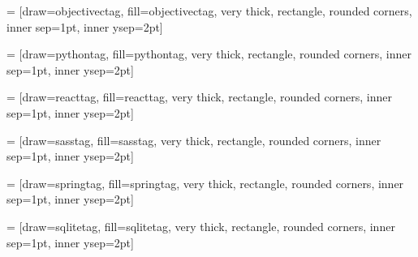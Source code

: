  = [draw=objectivectag, fill=objectivectag, very thick, rectangle, rounded corners, inner sep=1pt, inner ysep=2pt]
\newcommand{\objectivectag}{\begin{tikzpicture}\node [objectivectag] (box){{\scriptsize \textbf{\phantom{|}Objective-C\phantom{|}}}};\end{tikzpicture}}
\usepackage{tikz}
    
 = [draw=pythontag, fill=pythontag, very thick, rectangle, rounded corners, inner sep=1pt, inner ysep=2pt]
\newcommand{\pythontag}{\begin{tikzpicture}\node [pythontag] (box){{\scriptsize \textbf{\phantom{|}Python\phantom{|}}}};\end{tikzpicture}}
\usepackage{tikz}
    
 = [draw=reacttag, fill=reacttag, very thick, rectangle, rounded corners, inner sep=1pt, inner ysep=2pt]
\newcommand{\reacttag}{\begin{tikzpicture}\node [reacttag] (box){{\scriptsize \textbf{\phantom{|}React\phantom{|}}}};\end{tikzpicture}}
\usepackage{tikz}
    
 = [draw=sasstag, fill=sasstag, very thick, rectangle, rounded corners, inner sep=1pt, inner ysep=2pt]
\newcommand{\sasstag}{\begin{tikzpicture}\node [sasstag] (box){{\scriptsize \textbf{\phantom{|}SASS\phantom{|}}}};\end{tikzpicture}}
\usepackage{tikz}
    
 = [draw=springtag, fill=springtag, very thick, rectangle, rounded corners, inner sep=1pt, inner ysep=2pt]
\newcommand{\springtag}{\begin{tikzpicture}\node [springtag] (box){{\scriptsize \textbf{\phantom{|}Spring\phantom{|}}}};\end{tikzpicture}}
\usepackage{tikz}
    
 = [draw=sqlitetag, fill=sqlitetag, very thick, rectangle, rounded corners, inner sep=1pt, inner ysep=2pt]
\newcommand{\sqlitetag}{\begin{tikzpicture}\node [sqlitetag] (box){{\scriptsize \textbf{\phantom{|}SQLite\phantom{|}}}};\end{tikzpicture}}
\usepackage{tikz}
    
